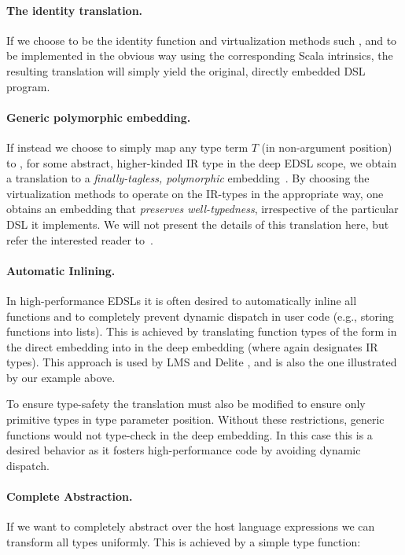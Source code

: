 \documentclass[paper.tex]{subfiles}
\begin{document}
\paragraph{The identity translation.}  If we choose  to be
the identity function and virtualization methods such ,
 and  to be implemented in the obvious way using
the corresponding Scala intrinsics, the resulting translation will
simply yield the original, directly embedded DSL program.

\paragraph{Generic polymorphic embedding.} If instead we choose
 to simply map any type term $T$ (in non-argument
position) to , for some abstract, higher-kinded IR type
 in the deep EDSL scope, we obtain a translation to a
\emph{finally-tagless, polymorphic}
embedding~\cite{carette_finally_2009,hofer_polymorphic_2008}.  By
choosing the virtualization methods to operate on the IR-types in the
appropriate way, one obtains an embedding that \emph{preserves
  well-typedness}, irrespective of the particular DSL it implements.
We will not present the details of this translation here, but refer
the interested reader to~\cite{carette_finally_2009}.

\paragraph{Automatic Inlining.} In high-performance EDSLs it is often desired to automatically inline all functions and to completely prevent dynamic dispatch in user code (e.g., storing functions into lists).  This is achieved by translating function types of the form  in the direct embedding into  in the deep embedding (where  again designates IR types).  This approach is used by LMS \cite{rompf_lightweight_2012} and Delite \cite{brown_heterogeneous_2011}, and is also the one illustrated by our example above.

To ensure type-safety the translation must also be modified to ensure only
primitive types in type parameter position. Without these restrictions, generic
functions would not type-check in the deep embedding. In this case this is a desired behavior as it fosters high-performance code by avoiding dynamic dispatch.

\paragraph{Complete Abstraction.} If we want to completely abstract over the host language expressions we can transform all types uniformly. This is achieved by a simple type function:
\end{document}
